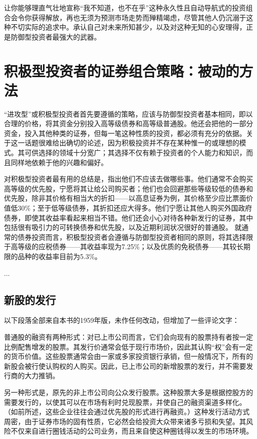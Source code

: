 \documentclass[12pt,oneside]{book}
\begin{document}
让你能够理直气壮地宣称“我不知道，也不在乎”这种永久性且自动导航式的投资组合会令你获得解放，再也无须为预测市场走势而殚精竭虑，尽管其他人仍沉溺于这种不切实际的追求中。承认自己对未来所知甚少，以及对这种无知的心安理得，正是防御型投资者最强大的武器。


\section{积极型投资者的证券组合策略：被动的方法}
“进攻型”或积极型投资者首先要遵循的策略，应该与防御型投资者基本相同，即以合理的价格，将其资金分别投入高等级债券和高等级普通股。他还会把他的一部分资金，投入其他种类的证券，但每一笔这种性质的投资，都必须有充分的依据。关于这一话题很难给出确切的论述，因为积极投资并不存在某种惟一的或理想的模式。其可供选择的领域十分宽广；其选择不仅有赖于投资者的个人能力和知识，而且同样地依赖于他的兴趣和偏好。

对积极型投资者最有用的总结是，指出他们不应该去做哪些事。他们通常不会购买高等级的优先股，宁愿将其让给公司购买者；他们也会回避那些等级较低的债券和优先股，除非其价格有相当大的折扣——以高息证券为例，其价格至少应比票面价值低30\%；至于低等级债券，其折扣还应大得多。他们宁愿让其他人购买外国政府债券，即使其收益率看起来相当不错。他们还会小心对待各种新发行的证券，其中包括很有吸引力的可转换债券和优先股，以及近期利润状况很好的普通股。
就通常的债券投资而言，积极型投资者会遵循与防御型投资者相同的原则，将其选择限于高等级的应税债券——其收益率现为7.25\%；以及优质的免税债券——其较长期限的品种的收益率目前为5.3\%。

...


\subsection{新股的发行}
以下段落全部来自本书的1959年版，未作任何改动，但增加了一些评论文字：

普通股的融资有两种形式：对已上市公司而言，它们会向现有的股票持有者按一定比例配售增发的股票。其发行价通常会低于现行市场价，因此其认购“权”会有一定的货币价值。这些股票通常会由一家或多家投资银行承销，但一般情况下，所有的新股会被行使认购权的人购买。因此，已上市公司的新增股票的发行，并不需要发行商的大力推销。

另一种形式是，原先的非上市公司向公众发行股票。这种股票大多是根据控股方的需要发行的，以使其可以在市场有利时兑现股票，并使自己的融资渠道多样化。（如前所述，这些企业往往会通过优先股的形式进行再融资。）这种发行活动方式周密，由于证券市场的固有性质，它必然会给投资大众带来诸多亏损和失望。其风险不仅来自进行圈钱活动的公司业务，而且来自使这种圈钱得以发生的市场环境。
\end{document}
